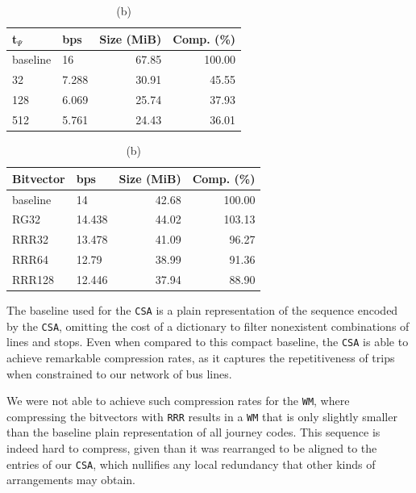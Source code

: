 \documentclass[runningheads]{llncs}
\newcommand{\ttctr}{TTCTR}
\begin{document}
\begin{table}
    \caption{Space requirements for the \texttt{CSA} (a) and the \texttt{WM} (b) from \ttctr}
    \label{tab:ttctr}
    \begin{subtable}[t]{.48\linewidth}
    \vspace{-12pt}
    \caption{\footnotesize (a)}
    \vspace{-12pt}
    \begin{tabular}[t]{|l|l|r|r|}
        \hline
        t$_\Psi$ & bps & Size (MiB) & Comp. (\%) \\
         \hline
        baseline & 16 & 67.85 & 100.00 \\
        32 & 7.288 & 30.91 & 45.55 \\
        128 & 6.069 & 25.74 & 37.93 \\
        512 & 5.761 & 24.43 & 36.01 \\
        \hline
    \end{tabular}
    \end{subtable}%
    \begin{subtable}[t]{.48\linewidth}
    \vspace{-12pt}
    \caption{\footnotesize (b)}
    \vspace{-12pt}
    \begin{tabular}[t]{|l|l|r|r|}
        \hline
        Bitvector & bps & Size (MiB) & Comp. (\%) \\
         \hline
        baseline & 14 & 42.68 & 100.00 \\
        RG32 & 14.438 & 44.02 & 103.13 \\
        RRR32 & 13.478 & 41.09 & 96.27 \\
        RRR64 & 12.79 & 38.99 & 91.36 \\
        RRR128 & 12.446 & 37.94 & 88.90 \\
        \hline
    \end{tabular}
    \end{subtable}
\end{table}

The baseline used for the \texttt{CSA} is a plain representation of the sequence encoded by the \texttt{CSA}, omitting the cost of a dictionary to filter nonexistent combinations of lines and stops. Even when compared to this compact baseline, the \texttt{CSA} is able to achieve remarkable compression rates, as it captures the repetitiveness of trips when constrained to our network of bus lines.

We were not able to achieve such compression rates for the \texttt{WM}, where compressing the bitvectors with \texttt{RRR} results in a \texttt{WM} that is only slightly smaller than the baseline plain representation of all journey codes. This sequence is indeed hard to compress, given than it was rearranged to be aligned to the entries of our \texttt{CSA}, which nullifies any local redundancy that other kinds of arrangements may obtain.
\end{document}
